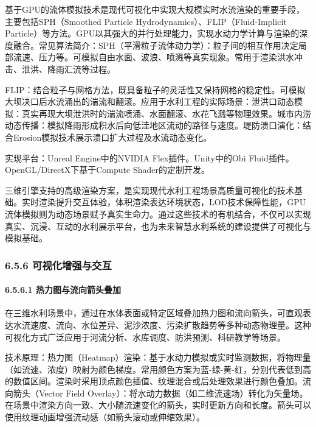 基于GPU的流体模拟技术是现代可视化中实现大规模实时水流渲染的重要手段，主要包括SPH（Smoothed Particle Hydrodynamics）、FLIP（Fluid-Implicit Particle）等方法。GPU以其强大的并行处理能力，实现水动力学计算与渲染的深度融合。常见算法简介：SPH（平滑粒子流体动力学）：粒子间的相互作用决定局部流速、压力等。可模拟自由水面、波浪、喷溅等真实现象。常用于渲染洪水冲击、泄洪、降雨汇流等过程。

FLIP：结合粒子与网格方法，既具备粒子的灵活性又保持网格的稳定性。可模拟大坝决口后水流涌出的湍流和翻滚。应用于水利工程的实际场景：泄洪口动态模拟：真实再现大坝泄洪时的湍流喷涌、水面翻滚、水花飞溅等物理效果。城市内涝动态传播：模拟降雨形成积水后向低洼地区流动的路径与速度。堤防溃口演化：结合Erosion模拟技术展示溃口扩大过程及水流动态变化。

实现平台：Unreal Engine中的NVIDIA Flex插件。Unity中的Obi Fluid插件。OpenGL/DirectX下基于Compute Shader的定制开发。

三维引擎支持的高级渲染方案，是实现现代水利工程场景高质量可视化的技术基础。实时渲染提升交互体验，体积渲染表达环境状态，LOD技术保障性能，GPU流体模拟则为动态场景赋予真实生命力。通过这些技术的有机结合，不仅可以实现真实、沉浸、互动的水利展示平台，也为未来智慧水利系统的建设提供了可视化与模拟基础。

\hypertarget{ux53efux89c6ux5316ux589eux5f3aux4e0eux4ea4ux4e92}{%
\subsubsection{6.5.6 可视化增强与交互}\label{ux53efux89c6ux5316ux589eux5f3aux4e0eux4ea4ux4e92}}

\hypertarget{ux70edux529bux56feux4e0eux6d41ux5411ux7badux5934ux53e0ux52a0}{%
\paragraph{6.5.6.1 热力图与流向箭头叠加}\label{ux70edux529bux56feux4e0eux6d41ux5411ux7badux5934ux53e0ux52a0}}

在三维水利场景中，通过在水体表面或特定区域叠加热力图和流向箭头，可直观表达水流速度、流向、水位差异、泥沙浓度、污染扩散趋势等多种动态物理量。这种可视化方式广泛应用于河流分析、水库调度、防洪预测、科研教学等场景。

技术原理：热力图（Heatmap）渲染：基于水动力模拟或实时监测数据，将物理量（如流速、浓度）映射为颜色梯度。常用颜色方案为蓝-绿-黄-红，分别代表低到高的数值区间。渲染时采用顶点颜色插值、纹理混合或后处理效果进行颜色叠加。流向箭头（Vector Field Overlay）：将水动力数据（如二维流速场）转化为矢量场。在场景中渲染方向一致、大小随流速变化的箭头，实时更新方向和长度。箭头可以使用纹理动画增强流动感（如箭头滚动或伸缩效果）。

